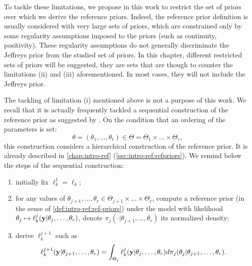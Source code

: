 To tackle these limitations, we propose in this work to restrict the set of priors over which we derive the reference priors.
Indeed, the reference prior definition is usually considered with very large sets of priors, which are constrained only by some regularity assumptions imposed to the priors (such as continuity, positivity). These regularity assumptions do not generally discriminate the Jeffreys prior from the studied set of priors.
In this chapter, different restricted sets of priors will be suggested, they are sets that are though 
to counter the limitations (ii) and (iii) aforementioned. In most cases, they will not include the Jeffreys prior.



The tackling of limitation (i) mentioned above is not a purpose of this work. We recall that it is actually frequently tackled a sequential construction of the reference prior as %
suggested by \citet{bernardo_reference_1979}.
On the condition that an ordering of the parameters is set:
 \begin{equation}
     \theta = (\theta_1,\dots,\theta_r) \in \Theta=\Theta_1\times\dots\times\Theta_r,
 \end{equation}
this construction considers a hierarchical construction of the reference prior.
It is already described in \cref{chap:intro-ref} (\cref{sec:intro-ref:refpriors}). We remind below the steps of the sequential construction:
%
 \begin{enumerate}
     \item initially fix $\ell_k^1=\ell_k$;
     \item for any values of $\theta_{j+1},\dots,\theta_r\in\Theta_{j+1}\times\dots\times\Theta_r$, compute a reference prior (in the sense of \cref{def:intro-ref:ref-priors})  under the model with likelihood $\theta_j\mapsto\ell_k^j(\mathbf{y}|\theta_j,\dots,\theta_r)$, denote $\pi_j(\cdot|\theta_{j+1},\dots,\theta_r)$ its normalized density;
     \item derive $\ell_k^{j+1}$ such as 
         \begin{equation} %
            \ell_k^{j+1}(\mbf y|\theta_{j+1},\dots,\theta_r) =  \int_{\Theta_j}\ell_k^j(\mbf y|\theta_j,\dots,\theta_r)d\pi_j(\theta_j|\theta_{j+1},\dots,\theta_r).
         \end{equation}
 \end{enumerate}


